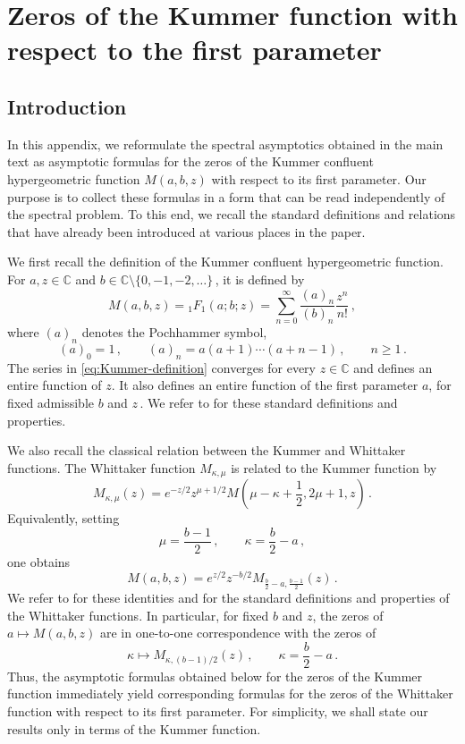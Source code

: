 \documentclass[11pt]{amsart}
\numberwithin{equation}{section}
\theoremstyle{remark}
\newcommand{\mn}{\medskip\noindent}
\begin{document}
\section{Zeros of the Kummer function with respect to the first parameter}\label{AppB}

\subsection{Introduction}

In this appendix, we reformulate the spectral asymptotics obtained in the main text as asymptotic formulas for the zeros of the Kummer confluent hypergeometric function $M(a,b,z)$ with respect to its first parameter. Our purpose is to collect these formulas in a form that can be read independently of the spectral problem. To this end, we recall the standard definitions and relations that have already been introduced at various places in the paper. 

\mn
We first recall the definition of the Kummer confluent hypergeometric
function. For $a,z\in\mathbb{C}$ and
$b\in\mathbb{C}\setminus\{0,-1,-2,\ldots\}\,$, it is defined by
\begin{equation}\label{eq:Kummer-definition}
	M(a,b,z)={}_1F_1(a;b;z)
	=
	\sum_{n=0}^{\infty}
	\frac{(a)_n}{(b)_n}\frac{z^n}{n!}\,,
\end{equation}
where $(a)_n$ denotes the Pochhammer symbol,
\[
(a)_0=1\,,
\qquad
(a)_n=a(a+1)\cdots(a+n-1)\,,
\qquad n\geq1\,.
\]
The series in \eqref{eq:Kummer-definition}
converges for every $z\in\mathbb{C}$ and defines an entire function of
$z$. It also defines an entire function of the first parameter $a$,
for fixed admissible $b$ and $z\,$. We refer to
\cite[\S 13.2, Eq.~(13.2.2)]{DLMF} for these standard definitions and
properties.

\mn
We also recall the classical relation between the Kummer and Whittaker
functions. The Whittaker function $M_{\kappa,\mu}$ is related to the
Kummer function by
\begin{equation}
M_{\kappa,\mu}(z)
=
e^{-z/2}z^{\mu+1/2}
M\left(\mu-\kappa+\frac12,2\mu+1,z\right)\,.
\end{equation}
Equivalently, setting
\[
\mu=\frac{b-1}{2}\,,
\qquad
\kappa=\frac{b}{2}-a\,,
\]
one obtains
\[
M(a,b,z)
=
e^{z/2}z^{-b/2}
M_{\frac{b}{2}-a,\frac{b-1}{2}}(z)\,.
\]
We refer to \cite[\S 13.14, Eqs.~(13.14.2) and (13.14.4)]{DLMF}
for these identities and for the standard definitions and properties
of the Whittaker functions. In particular, for fixed $b$ and $z$, the zeros of
$a\mapsto M(a,b,z)$ are in one-to-one correspondence with the zeros of
\[
\kappa\mapsto M_{\kappa,(b-1)/2}(z)\,,
\qquad
\kappa=\frac{b}{2}-a\,.
\]
Thus, the asymptotic formulas obtained below for the zeros of the
Kummer function immediately yield corresponding formulas for the
zeros of the Whittaker function with respect to its first parameter.
For simplicity, we shall state our results only in terms of the Kummer
function.
\end{document}

